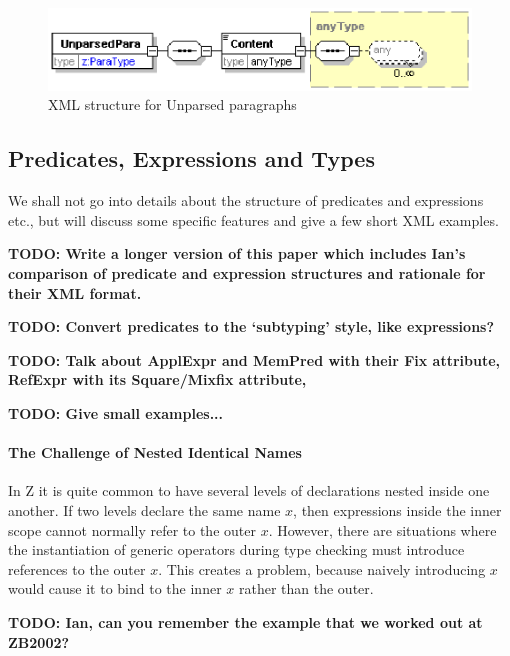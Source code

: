 \documentclass{llncs}  %
\newcommand{\TODO}[1]{\textbf{TODO: #1}}   %
\begin{document}
\begin{figure}[htbp]
  \centering
  \includegraphics[width=\textwidth]{unparsedpara.eps}
  \caption{XML structure for Unparsed paragraphs}
  \label{fig:unparsed}
\end{figure}


\subsection{Predicates, Expressions and Types}

We shall not go into details about the structure of predicates and
expressions etc., but will discuss some specific features and give
a few short XML examples.

\TODO{Write a longer version of this paper which includes Ian's
  comparison of predicate and expression structures and rationale
  for their XML format.}

\TODO{Convert predicates to the `subtyping' style, like expressions?}

\TODO{Talk about ApplExpr and MemPred with their Fix attribute, RefExpr
  with its Square/Mixfix attribute, }

\TODO{Give small examples...}


\paragraph{The Challenge of Nested Identical Names}

In Z it is quite common to have several levels of declarations nested 
inside one another.  If two levels declare the same name $x$, then
expressions inside the inner scope cannot normally refer to the outer $x$.
However, there are situations where the instantiation of generic
operators during type checking must introduce references to the outer $x$.
This creates a problem, because naively introducing $x$ would cause it
to bind to the inner $x$ rather than the outer.

\TODO{Ian, can you remember the example that we worked out at ZB2002?}
\end{document}
